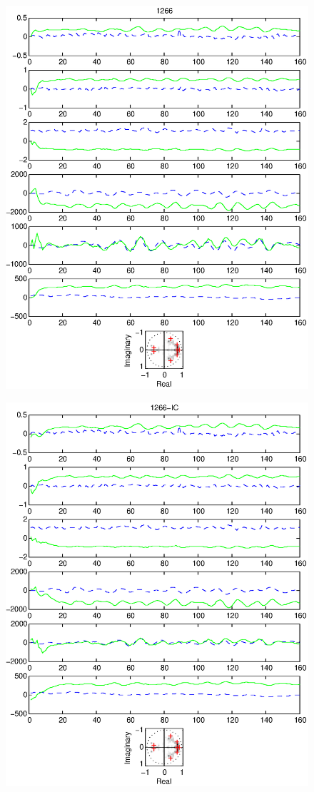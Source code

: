 \documentclass{article}
\begin{document}
\begin{figure}[htb!]
\centering
\includegraphics{1266.eps}
\end{figure}\clearpage
\begin{figure}[htb!]
\centering
\includegraphics{1266_ic.eps}
\end{figure}\clearpage
\end{document}
